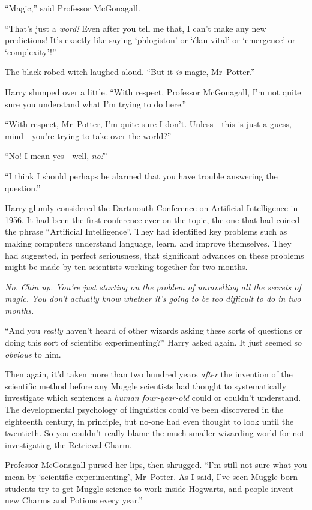 “Magic,” said Professor McGonagall.

“That’s just a \emph{word!} Even after you tell me that, I can’t make any new predictions! It’s exactly like saying ‘phlogiston’ or ‘élan vital’ or ‘emergence’ or ‘complexity’!”

The black-robed witch laughed aloud. “But it \emph{is} magic, Mr~Potter.”

Harry slumped over a little. “With respect, Professor McGonagall, I’m not quite sure you understand what I’m trying to do here.”

“With respect, Mr~Potter, I’m quite sure I don’t. Unless—this is just a guess, mind—you’re trying to take over the world?”

“No! I mean yes—well, \emph{no!}”

“I think I should perhaps be alarmed that you have trouble answering the question.”

Harry glumly considered the Dartmouth Conference on Artificial Intelligence in 1956. It had been the first conference ever on the topic, the one that had coined the phrase “Artificial Intelligence”. They had identified key problems such as making computers understand language, learn, and improve themselves. They had suggested, in perfect seriousness, that significant advances on these problems might be made by ten scientists working together for two months.

\emph{No. Chin up. You’re just \emph{starting} on the problem of unravelling all the secrets of magic. You don’t actually \emph{know} whether it’s going to be too difficult to do in two months.}

“And you \emph{really} haven’t heard of other wizards asking these sorts of questions or doing this sort of scientific experimenting?” Harry asked again. It just seemed so \emph{obvious} to him.

Then again, it’d taken more than two hundred years \emph{after} the invention of the scientific method before any Muggle scientists had thought to systematically investigate which sentences a \emph{human four-year-old} could or couldn’t understand. The developmental psychology of linguistics could’ve been discovered in the eighteenth century, in principle, but no-one had even thought to look until the twentieth. So you couldn’t really blame the much smaller wizarding world for not investigating the Retrieval Charm.

Professor McGonagall pursed her lips, then shrugged. “I’m still not sure what you mean by ‘scientific experimenting’, Mr~Potter. As I said, I’ve seen Muggle-born students try to get Muggle science to work inside Hogwarts, and people invent new Charms and Potions every year.”

